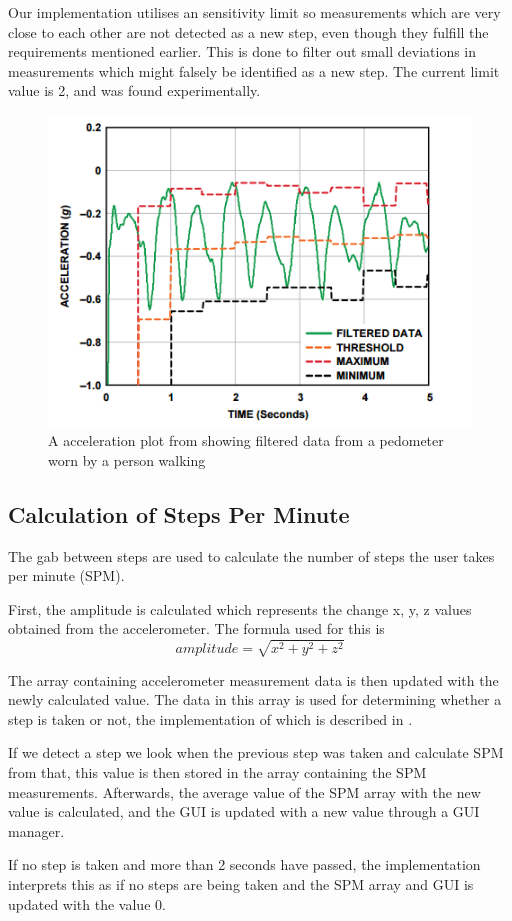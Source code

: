 Our implementation utilises an sensitivity limit so measurements which are very close to each other are not detected as a new step, even though they fulfill the requirements mentioned earlier. This is done to filter out small deviations in measurements which might falsely be identified as a new step. The current limit value is 2, and was found experimentally.
\begin{figure}[h!]
  \centering
    \includegraphics[scale=0.8]{Images/accPlot.png}
  \caption{A acceleration plot from \citet[p. 2]{zhao:pedometer} showing filtered data from a pedometer worn by a person walking}
  \label{fig:zhaoGraph}
\end{figure}


\subsection{Calculation of Steps Per Minute}
The gab between steps are used to calculate the number of steps the user takes per minute (SPM).

First, the amplitude is calculated which represents the change x, y, z values obtained from the accelerometer. The formula used for this is $$amplitude = \sqrt{x^{2} + y^{2} + z^{2}}$$

The array containing accelerometer measurement data is then updated with the newly calculated value. The data in this array is used for determining whether a step is taken or not, the implementation of which is described in .

If we detect a step we look when the previous step was taken and calculate SPM from that, this value is then stored in the array containing the SPM measurements. Afterwards, the average value of the SPM array with the new value is calculated, and the GUI is updated with a new value through a GUI manager.

If no step is taken and more than 2 seconds have passed, the implementation interprets this as if no steps are being taken and the SPM array and GUI is updated with the value 0.